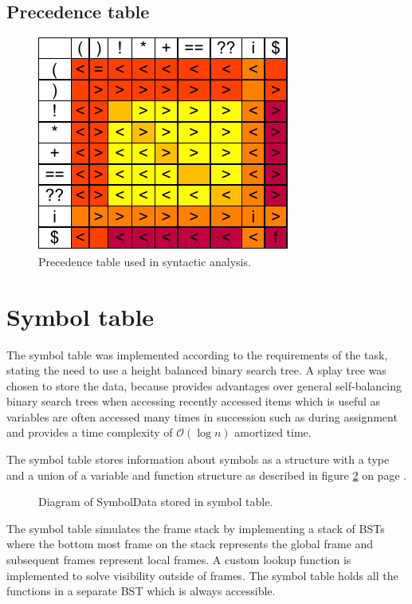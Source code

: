 \documentclass[11pt]{article}
\begin{document}
\subsection{Precedence table}

\begin{figure}[h]
	\centering
	\includegraphics[scale=1.3]{Precedencna Tabulka.pdf}
	\caption{Precedence table used in syntactic analysis.}
	\label{fig:prectable}
\end{figure}



\section{Symbol table}

The symbol table was implemented according to the requirements of the task, stating the need to use a height balanced binary search tree. A splay tree was chosen to store the data, because provides advantages over general self-balancing binary search trees when accessing recently accessed items which is useful as variables are often accessed many times in succession such as during assignment and provides a time complexity of $\mathcal{O}(\log{}n)$ amortized time.\cite{Pfaff_2004}

The symbol table stores information about symbols as a structure with a type and a union of a variable and function structure as described in figure \ref{fig:symboldata} on page \pageref{fig:symboldata}.


\begin{figure}[h]
	\centering
	
	\caption{Diagram of SymbolData stored in symbol table.}
	\label{fig:symboldata}
\end{figure}

The symbol table simulates the frame stack by implementing a stack of BSTs where the bottom most frame on the stack represents the global frame and subsequent frames represent local frames. A custom lookup function is implemented to solve visibility outside of frames. The symbol table holds all the functions in a separate BST which is always accessible.
\end{document}
